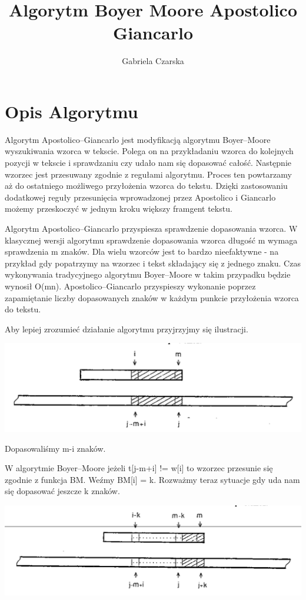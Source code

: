 \documentclass[12pt]{article}
\theoremstyle{plain}
\begin{document}
\title{Algorytm Boyer Moore Apostolico Giancarlo}
\author{Gabriela Czarska}
\maketitle

\section*{Opis Algorytmu}
Algorytm Apostolico–Giancarlo jest modyfikacją algorytmu Boyer–Moore wyszukiwania wzorca w tekscie. Polega on na przykładaniu wzorca do kolejnych pozycji w tekscie i sprawdzaniu czy udało nam się dopasować całość. Następnie wzorzec jest przesuwany zgodnie z regułami algorytmu. Proces ten powtarzamy aż do ostatniego możliwego przyłożenia wzorca do tekstu. Dzięki zastosowaniu dodatkowej reguły przesunięcia wprowadzonej przez Apostolico i Giancarlo możemy przeskoczyć w jednym kroku większy framgent tekstu.


Algorytm Apostolico–Giancarlo przyspiesza sprawdzenie dopasowania wzorca. W klasycznej wersji algorytmu sprawdzenie dopasowania wzorca długość m wymaga sprawdzenia m znaków. Dla wielu wzorców jest to bardzo nieefaktywne - na przykład gdy popatrzymy na wzorzec i tekst składający się z jednego znaku. Czas wykonywania tradycyjnego algorytmu Boyer–Moore w takim przypadku będzie wynosił O(mn). Apostolico–Giancarlo przyspieszy wykonanie poprzez zapamiętanie liczby dopasowanych znaków w każdym punkcie przyłożenia wzorca do tekstu.

Aby lepiej zrozumieć działanie algorytmu przyjrzyjmy się ilustracji.


\includegraphics[scale=0.5]{p/1.png}


Dopasowaliśmy m-i znaków.

W algorytmie Boyer–Moore jeżeli t[j-m+i] != w[i] to wzorzec przesunie się zgodnie z funkcja BM.
Weźmy BM[i] = k. Rozważmy teraz sytuacje gdy uda nam się dopasować jeszcze k znaków.

\includegraphics[scale=0.5]{p/2.png}
\end{document}
